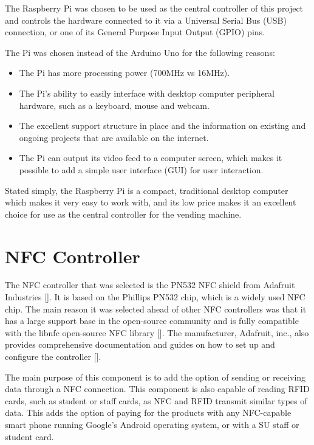 The Raspberry Pi was chosen to be used as the central controller of this project and
controls the hardware connected to it via a Universal Serial Bus (USB) connection, or one of
its General Purpose Input Output (GPIO) pins.

The Pi was chosen instead of the Arduino Uno for the following reasons:

\begin{itemize}
  
  \item The Pi has more processing power (700MHz vs 16MHz).
  \item The Pi's ability to easily interface with desktop computer peripheral hardware,
  such as a keyboard, mouse and webcam.
  \item The excellent support structure in place and the information on existing and ongoing
  projects that are available on the internet.
  \item The Pi can output its video feed to a computer screen, which makes it possible to
  add a simple user interface (GUI) for user interaction. 

\end{itemize}

Stated simply, the Raspberry Pi is a compact, traditional desktop computer which makes it very
easy to work with, and its low price makes it an excellent choice for use as the central
controller for the vending machine.

\section{NFC Controller}
\label{sec:nfc-controller}

The NFC controller that was selected is the PN532 NFC shield from Adafruit Industries
[\cite{website:adafruit-nfc}]. It is based on
the Phillips PN532 chip, which is a widely used NFC chip. The main reason it was selected ahead
of other NFC controllers was that it has a large support base in the open-source
community and is fully compatible with the libnfc open-source NFC library
[\cite{website:libnfc-hardware}]. The manufacturer, Adafruit, inc., also provides
comprehensive documentation and guides on how to set up and configure the controller
[\cite{website:adafruit-tutorial}].
 
The main purpose of this component is to add the option of sending or receiving data
through a NFC connection.
This component is also capable of reading RFID cards, such as student or staff cards, as
NFC and RFID transmit similar types of data. This adds the option of paying for the products with 
any NFC-capable smart phone running Google's Android operating system, or with a SU staff or
student card.

